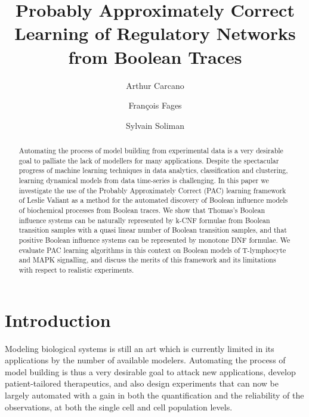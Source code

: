 \documentclass{llncs}
\begin{document}
\title{Probably Approximately Correct Learning of Regulatory Networks from Boolean Traces}

\author{Arthur Carcano \and Fran\c{c}ois Fages \and Sylvain
Soliman}


\maketitle

\begin{abstract}
Automating the process of model building from experimental data 
is a very desirable goal to palliate the lack of modellers for many applications.
Despite the spectacular progress of machine learning techniques in data analytics, classification and clustering,
learning dynamical models from data time-series is challenging.
In this paper we investigate the use of the Probably Approximately Correct (PAC) learning 
framework of Leslie Valiant as a method for the automated discovery of Boolean influence models of biochemical processes from Boolean traces. 
We show that Thomas's Boolean influence systems can be naturally represented by k-CNF formulae
from Boolean transition samples with a quasi linear number of Boolean transition samples,
and that positive Boolean influence systems can be represented by monotone DNF formulae.
We evaluate PAC learning algorithms in this context on Boolean models of T-lymphocyte and MAPK signalling,
and discuss the merits of this framework and its limitations with respect to realistic experiments.
\end{abstract}

\section{Introduction}

Modeling biological systems is still an art which is currently limited in its applications by the number of available modelers.
Automating the process of model building is thus a very desirable goal
to attack new applications, develop patient-tailored therapeutics,
and also design experiments that can now be largely automated
with a gain in both the quantification and the reliability of the observations, at both the single cell and cell population levels.
\end{document}
